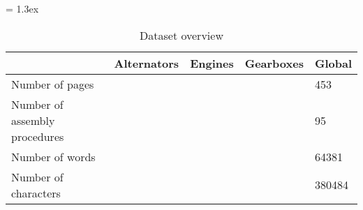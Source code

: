 \begin{table*}[t]
	\caption{Dataset overview}
	\tabulinesep = 1.3ex
	\centering
	\begin{tabu} { X[2.5,m,c] | X[m,c] X[m,c] X[m,c] X[m,c] }
		\rowfont{\bfseries\itshape} 	& Alternators									& Engines																& Gearboxes 										& Global 	\\
		\hline
		Number of pages 				& 			& 						& 			& 453		\\
		Number of assembly procedures 	& 				& 							& 				& 95		\\
		Number of words					& 	& 		& 		& 64381		\\
		Number of characters			& 	& 	& 	& 380484	\\
	\end{tabu}
	\label{tab:dataset-sources_dataset-overview}
\end{table*}
